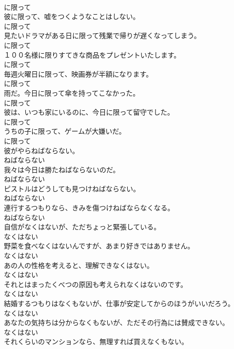 \documentclass[8pt]{extreport}
\begin{document}
\begin{CJK}{UTF8}{min}
\\	に限って
\\	彼に限って、嘘をつくようなことはしない。	
\\	に限って
\\	見たいドラマがある日に限って残業で帰りが遅くなってしまう。	
\\	に限って
\\	１００名様に限りすてきな商品をプレゼントいたします。	
\\	に限って
\\	毎週火曜日に限って、映画券が半額になります。	
\\	に限って
\\	雨だ。今日に限って傘を持ってこなかった。	
\\	に限って
\\	彼は、いつも家にいるのに、今日に限って留守でした。	
\\	に限って
\\	うちの子に限って、ゲームが大嫌いだ。	
\\	に限って
\\	彼がやらねばならない。	
\\	ねばならない
\\	我々は今日は勝たねばならないのだ。	
\\	ねばならない
\\	ピストルはどうしても見つけねばならない。	
\\	ねばならない
\\	連行するつもりなら、きみを傷つけねばならなくなる。	
\\	ねばならない
\\	自信がなくはないが、ただちょっと緊張している。	
\\	なくはない
\\	野菜を食べなくはないんですが、あまり好きではありません。	
\\	なくはない
\\	あの人の性格を考えると、理解できなくはない。	
\\	なくはない
\\	それとはまったくべつの原因も考えられなくはないのです。	
\\	なくはない
\\	結婚するつもりはなくもないが、仕事が安定してからのほうがいいだろう。	
\\	なくはない
\\	あなたの気持ちは分からなくもないが、ただその行為には賛成できない。	
\\	なくはない
\\	それくらいのマンションなら、無理すれば買えなくもない。	

\end{CJK}
\end{document}
